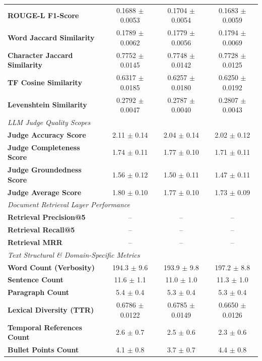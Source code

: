 \begin{table}[t]
\begin{tabular}{lccc}
\textbf{ROUGE-L F1-Score} & 0.1688 $\pm$ 0.0053 & 0.1704 $\pm$ 0.0054 & 0.1683 $\pm$ 0.0059 \\
\textbf{Word Jaccard Similarity} & 0.1789 $\pm$ 0.0062 & 0.1779 $\pm$ 0.0056 & 0.1794 $\pm$ 0.0069 \\
\textbf{Character Jaccard Similarity} & 0.7752 $\pm$ 0.0145 & 0.7748 $\pm$ 0.0142 & 0.7728 $\pm$ 0.0125 \\
\textbf{TF Cosine Similarity} & 0.6317 $\pm$ 0.0185 & 0.6257 $\pm$ 0.0180 & 0.6250 $\pm$ 0.0192 \\
\textbf{Levenshtein Similarity} & 0.2792 $\pm$ 0.0047 & 0.2787 $\pm$ 0.0040 & 0.2807 $\pm$ 0.0043 \\
\midrule
\multicolumn{4}{l}{\textit{LLM Judge Quality Scopes}} \\
\textbf{Judge Accuracy Score} & 2.11 $\pm$ 0.14 & 2.04 $\pm$ 0.14 & 2.02 $\pm$ 0.12 \\
\textbf{Judge Completeness Score} & 1.74 $\pm$ 0.11 & 1.77 $\pm$ 0.10 & 1.71 $\pm$ 0.11 \\
\textbf{Judge Groundedness Score} & 1.56 $\pm$ 0.12 & 1.50 $\pm$ 0.11 & 1.47 $\pm$ 0.11 \\
\textbf{Judge Average Score} & 1.80 $\pm$ 0.10 & 1.77 $\pm$ 0.10 & 1.73 $\pm$ 0.09 \\
\midrule
\multicolumn{4}{l}{\textit{Document Retrieval Layer Performance}} \\
\textbf{Retrieval Precision@5} & -- & -- & -- \\
\textbf{Retrieval Recall@5} & -- & -- & -- \\
\textbf{Retrieval MRR} & -- & -- & -- \\
\midrule
\multicolumn{4}{l}{\textit{Text Structural \& Domain-Specific Metrics}} \\
\textbf{Word Count (Verbosity)} & 194.3 $\pm$ 9.6 & 193.9 $\pm$ 9.8 & 197.2 $\pm$ 8.8 \\
\textbf{Sentence Count} & 11.6 $\pm$ 1.1 & 11.0 $\pm$ 1.0 & 11.3 $\pm$ 1.0 \\
\textbf{Paragraph Count} & 5.4 $\pm$ 0.4 & 5.3 $\pm$ 0.4 & 5.3 $\pm$ 0.4 \\
\textbf{Lexical Diversity (TTR)} & 0.6786 $\pm$ 0.0122 & 0.6785 $\pm$ 0.0149 & 0.6650 $\pm$ 0.0126 \\
\textbf{Temporal References Count} & 2.6 $\pm$ 0.7 & 2.5 $\pm$ 0.6 & 2.3 $\pm$ 0.6 \\
\textbf{Bullet Points Count} & 4.1 $\pm$ 0.8 & 3.7 $\pm$ 0.7 & 4.4 $\pm$ 0.8 \\
\bottomrule
\end{tabular}
\end{table}